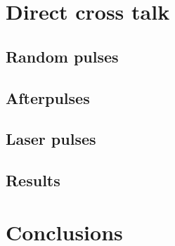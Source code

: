 \section{Direct cross talk}

\subsection{Random pulses}

\subsection{Afterpulses}

\subsection{Laser pulses}

\subsection{Results}

\section{Conclusions}

